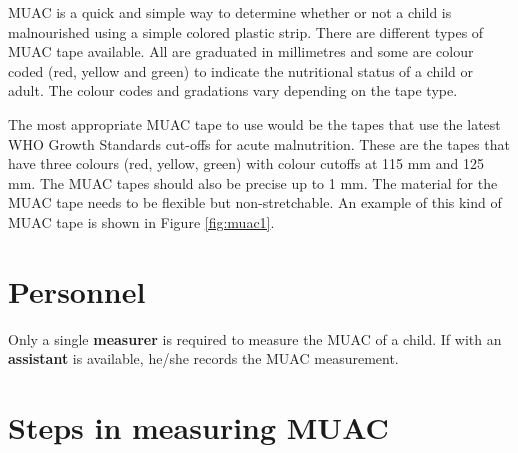 \documentclass[12pt,]{book}
\theoremstyle{definition}
\theoremstyle{definition}
\theoremstyle{definition}
\theoremstyle{remark}
\begin{document}
MUAC is a quick and simple way to determine whether or not a child is
malnourished using a simple colored plastic strip. There are different
types of MUAC tape available. All are graduated in millimetres and some
are colour coded (red, yellow and green) to indicate the nutritional
status of a child or adult. The colour codes and gradations vary
depending on the tape type.

The most appropriate MUAC tape to use would be the tapes that use the
latest WHO Growth Standards cut-offs for acute malnutrition. These are
the tapes that have three colours (red, yellow, green) with colour
cutoffs at 115 mm and 125 mm. The MUAC tapes should also be precise up
to 1 mm. The material for the MUAC tape needs to be flexible but
non-stretchable. An example of this kind of MUAC tape is shown in Figure
\ref{fig:muac1}.

\hypertarget{personnel-2}{%
\section{Personnel}\label{personnel-2}}

Only a single \textbf{measurer} is required to measure the MUAC of a
child. If with an \textbf{assistant} is available, he/she records the
MUAC measurement.

\hypertarget{steps-in-measuring-muac}{%
\section{Steps in measuring MUAC}\label{steps-in-measuring-muac}}
\end{document}
